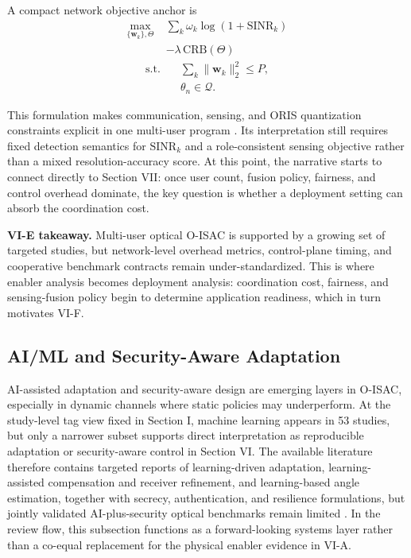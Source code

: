 \documentclass[letterpaper,journal]{IEEEtran}
\begin{document}
A compact network objective anchor is
\begin{equation}
    \begin{split}
        \max_{\{\mathbf{w}_k\},\Theta}\; & \sum_{k}\omega_k\log\!\left(1+\mathrm{SINR}_k\right) \\
                                         & -\lambda\,\mathrm{CRB}(\Theta)
    \end{split}
\end{equation}
\begin{equation}
    \begin{split}
        \text{s.t.}\quad & \sum_k\|\mathbf{w}_k\|_2^2\le P, \\
                         & \theta_n\in\mathcal Q.
    \end{split}
\end{equation}

This formulation makes communication, sensing, and ORIS quantization constraints explicit in one multi-user program \cite{O_ISAC_061,O_ISAC_091,O_ISAC_127}. Its interpretation still requires fixed detection semantics for $\mathrm{SINR}_k$ and a role-consistent sensing objective rather than a mixed resolution-accuracy score. At this point, the narrative starts to connect directly to Section VII: once user count, fusion policy, fairness, and control overhead dominate, the key question is whether a deployment setting can absorb the coordination cost.

\textbf{VI-E takeaway.} Multi-user optical O-ISAC is supported by a growing set of targeted studies, but network-level overhead metrics, control-plane timing, and cooperative benchmark contracts remain under-standardized. This is where enabler analysis becomes deployment analysis: coordination cost, fairness, and sensing-fusion policy begin to determine application readiness, which in turn motivates VI-F.

\subsection{AI/ML and Security-Aware Adaptation}

AI-assisted adaptation and security-aware design are emerging layers in O-ISAC, especially in dynamic channels where static policies may underperform. At the study-level tag view fixed in Section I, machine learning appears in 53 studies, but only a narrower subset supports direct interpretation as reproducible adaptation or security-aware control in Section VI. The available literature therefore contains targeted reports of learning-driven adaptation, learning-assisted compensation and receiver refinement, and learning-based angle estimation, together with secrecy, authentication, and resilience formulations, but jointly validated AI-plus-security optical benchmarks remain limited \cite{O_ISAC_017,O_ISAC_127,O_ISAC_145,O_ISAC_156,O_ISAC_157,O_ISAC_163,O_ISAC_245}. In the review flow, this subsection functions as a forward-looking systems layer rather than a co-equal replacement for the physical enabler evidence in VI-A.
\end{document}
